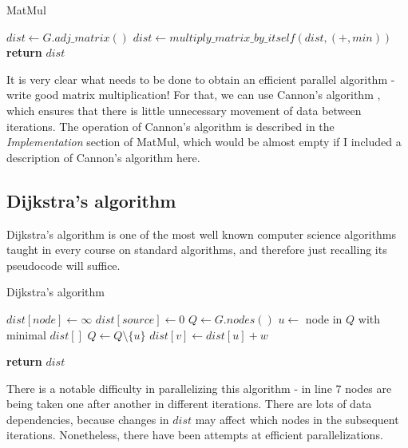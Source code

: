 \documentclass[12pt,a4paper,twoside,openright]{report}
\begin{document}
\begin{algorithm}
\caption{MatMul}\label{matmul}
\begin{algorithmic}[1]
\State $\textit{dist} \gets G.adj\_matrix()$
        \State $dist \gets multiply\_matrix\_by\_itself(dist,(+,min))$
      \EndFor
\State \textbf{return} $dist$
\EndProcedure
\end{algorithmic}
\end{algorithm}

It is very clear what needs to be done to obtain an efficient parallel algorithm - write good matrix multiplication! For that, we can use Cannon's algorithm \cite{cannon}, which ensures that there is little unnecessary movement of data between iterations. The operation of Cannon's algorithm is described in the \textit{Implementation} section of MatMul, which would be almost empty if I included a description of Cannon's algorithm here. 

\subsection{Dijkstra's algorithm}
Dijkstra's algorithm is one of the most well known computer science algorithms taught in every course on standard algorithms, and therefore just recalling its pseudocode will suffice.

\begin{algorithm}
\caption{Dijkstra's algorithm}\label{dijkstra}
\begin{algorithmic}[1]
    \State $dist[node] \gets \infty$
\EndFor
\State $dist[source] \gets 0$
\State $Q \gets G.nodes()$
        \State $u \gets$ node in $Q$ with minimal $dist[]$
        \State $Q \gets Q \setminus \{u\}$
            \State $dist[v] \gets dist[u] + w$
        \EndIf
      \EndFor
    \EndWhile
    
    
\State \textbf{return} $dist$
\EndProcedure
\end{algorithmic}
\end{algorithm}

There is a notable difficulty in parallelizing this algorithm - in line $7$ nodes are being taken one after another in different iterations. There are lots of data dependencies, because changes in $dist$ may affect which nodes in the subsequent iterations. Nonetheless, there have been attempts at efficient parallelizations.
\end{document}
